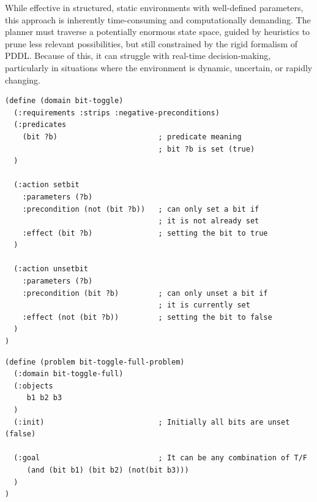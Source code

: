 While effective in structured, static environments with well-defined parameters,
this approach is inherently time-consuming and computationally demanding. The planner
must traverse a potentially enormous state space, guided by heuristics to prune
less relevant possibilities, but still constrained by the rigid formalism of PDDL.
Because of this, it can struggle with real-time decision-making, particularly in
situations where the environment is dynamic, uncertain, or rapidly changing.

\vspace{10mm}
\begin{codewindow}
    \begin{lstlisting}
(define (domain bit-toggle)
  (:requirements :strips :negative-preconditions)
  (:predicates
    (bit ?b)                       ; predicate meaning
                                   ; bit ?b is set (true)
  )

  (:action setbit
    :parameters (?b)
    :precondition (not (bit ?b))   ; can only set a bit if
                                   ; it is not already set
    :effect (bit ?b)               ; setting the bit to true
  )

  (:action unsetbit
    :parameters (?b)
    :precondition (bit ?b)         ; can only unset a bit if
                                   ; it is currently set
    :effect (not (bit ?b))         ; setting the bit to false
  )
)

\end{lstlisting}
\end{codewindow}
\vspace{10mm}

\vspace{10mm}
\begin{codewindow}
    \begin{lstlisting}
(define (problem bit-toggle-full-problem)
  (:domain bit-toggle-full)
  (:objects
     b1 b2 b3
  )
  (:init)                          ; Initially all bits are unset (false)

  (:goal                           ; It can be any combination of T/F
     (and (bit b1) (bit b2) (not(bit b3)))
  )
)
\end{lstlisting}
\end{codewindow}
\vspace{10mm}

